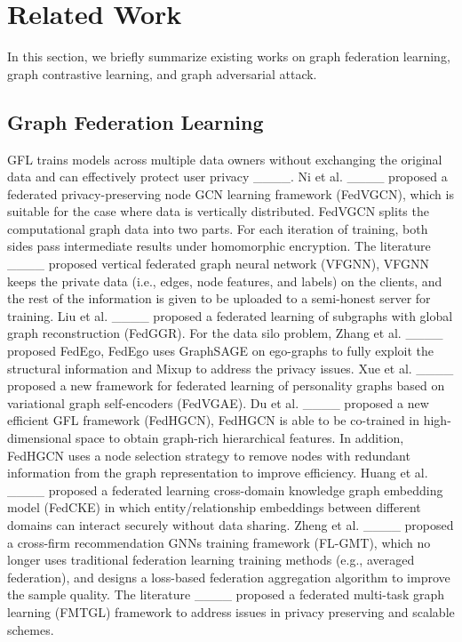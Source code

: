 \section{Related Work}
\label{S2}
In this section, we briefly summarize existing works on graph federation learning, graph contrastive learning, and graph adversarial attack.


\subsection{ Graph Federation Learning}\label{HypergraphLearning}

GFL trains models across multiple data owners without exchanging the original data and can effectively protect user privacy ____. Ni et al. ____ proposed a federated privacy-preserving node GCN learning framework (FedVGCN), which is suitable for the case where data is vertically distributed. FedVGCN splits the computational graph data into two parts. For each iteration of training, both sides pass intermediate results under homomorphic encryption. The literature ____ proposed vertical federated graph neural network (VFGNN), VFGNN keeps the private data (i.e., edges, node features, and labels) on the clients, and the rest of the information is given to be uploaded to a semi-honest server for training. Liu et al. ____ proposed a federated learning of subgraphs with global graph reconstruction (FedGGR).  For the data silo problem, Zhang et al. ____ proposed FedEgo, FedEgo uses GraphSAGE on ego-graphs to fully exploit the structural information and Mixup to address the privacy issues. Xue et al. ____ proposed a new framework for federated learning of personality graphs based on variational graph self-encoders (FedVGAE). Du et al. ____ proposed a new efficient GFL framework (FedHGCN), FedHGCN is able to be co-trained in high-dimensional space to obtain graph-rich hierarchical features. In addition, FedHGCN uses a node selection strategy to remove nodes with redundant information from the graph representation to improve efficiency.  Huang et al. ____ proposed a federated learning cross-domain knowledge graph embedding model (FedCKE) in which entity/relationship embeddings between different domains can interact securely without data sharing. Zheng et al. ____ proposed a cross-firm recommendation GNNs training framework (FL-GMT), which no longer uses traditional federation learning training methods (e.g., averaged federation), and designs a loss-based federation aggregation algorithm to improve the sample quality. The literature ____ proposed a federated multi-task graph learning (FMTGL) framework to address issues in privacy preserving and scalable schemes.

